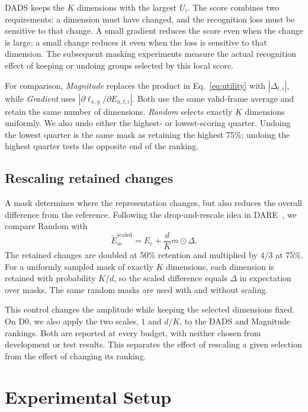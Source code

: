 \documentclass{article}
\begin{document}
DADS keeps the $K$ dimensions with the largest $U_i$. The score combines two requirements: a dimension must have changed, and the recognition loss must be sensitive to that change. A small gradient reduces the score even when the change is large; a small change reduces it even when the loss is sensitive to that dimension. The subsequent masking experiments measure the actual recognition effect of keeping or undoing groups selected by this local score.

For comparison, \emph{Magnitude} replaces the product in Eq.~\eqref{eq:utility} with $|\Delta_{t,i}|$, while \emph{Gradient} uses $|\partial\ell_{x,y}/\partial E_{a,t,i}|$. Both use the same valid-frame average and retain the same number of dimensions. \emph{Random} selects exactly $K$ dimensions uniformly. We also undo either the highest- or lowest-scoring quarter. Undoing the lowest quarter is the same mask as retaining the highest 75\%; undoing the highest quarter tests the opposite end of the ranking.

\subsection{Rescaling retained changes}
A mask determines where the representation changes, but also reduces the overall difference from the reference. Following the drop-and-rescale idea in DARE~\cite{yu2024dare}, we compare Random with
\begin{equation}
 \widetilde E_m^{\mathrm{scaled}}=E_r+\frac{d}{K}m\odot\Delta.
 \label{eq:scale}
\end{equation}
The retained changes are doubled at 50\% retention and multiplied by $4/3$ at 75\%. For a uniformly sampled mask of exactly $K$ dimensions, each dimension is retained with probability $K/d$, so the scaled difference equals $\Delta$ in expectation over masks. The same random masks are used with and without scaling.

This control changes the amplitude while keeping the selected dimensions fixed. On D0, we also apply the two scales, $1$ and $d/K$, to the DADS and Magnitude rankings. Both are reported at every budget, with neither chosen from development or test results. This separates the effect of rescaling a given selection from the effect of changing its ranking.

\section{Experimental Setup}
\label{sec:setup}
\end{document}

